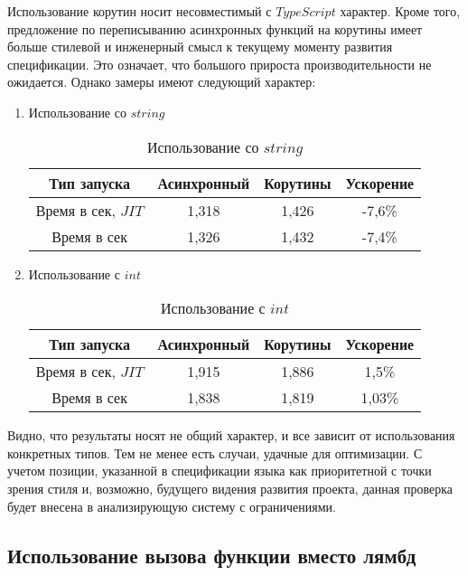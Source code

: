 \documentclass{mipt-thesis-bs}
\begin{document}
Использование корутин носит несовместимый с $TypeScript$ характер. Кроме того,
предложение по переписыванию асинхронных функций на корутины имеет больше стилевой
и инженерный смысл к текущему моменту развития спецификации. Это означает, что
большого прироста производительности не ожидается. Однако замеры имеют следующий характер:

\begin{enumerate}
    \item Использование со $string$
    \begin{table}[h]
        \centering
        \begin{tabular}{|c|c|c|c|}
          \hline
          Тип запуска & Асинхронный & Корутины & Ускорение \\
          \hline
          Время в сек, $JIT$ & 1,318 & 1,426 & -7,6\% \\
          \hline
          Время в сек & 1,326 & 1,432 & -7,4\% \\
          \hline
        \end{tabular}
        \caption{Использование со $string$}
      \end{table}
    \item Использование с $int$
    \begin{table}[h]
        \centering
        \begin{tabular}{|c|c|c|c|}
          \hline
          Тип запуска & Асинхронный & Корутины & Ускорение \\
          \hline
          Время в сек, $JIT$ & 1,915 & 1,886 & 1,5\% \\
          \hline
          Время в сек & 1,838 & 1,819 & 1,03\% \\
          \hline
        \end{tabular}
        \caption{Использование с $int$}
      \end{table}
\end{enumerate}

Видно, что результаты носят не общий характер, и все зависит от использования
конкретных типов. Тем не менее есть случаи, удачные для оптимизации. С учетом
позиции, указанной в спецификации языка как приоритетной с точки зрения стиля и,
возможно, будущего видения развития проекта, данная проверка будет внесена в
анализирующую систему с ограничениями.

\subsection{Использование вызова функции вместо лямбд}
\end{document}
